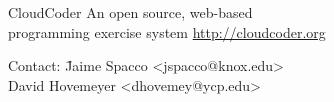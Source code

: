 \documentclass[11pt,a4paper]{memoir}
\begin{document}
\pagecolor{white}

\begin{minipage}[t]{50mm}
{\Huge CloudCoder}
\vskip 3mm
An open source, web-based\\
programming exercise system
\vskip 3mm
\url{http://cloudcoder.org}
\end{minipage}\hskip 2mm\begin{minipage}[t]{25mm}
\end{minipage}
\vskip 2mm
{\small
\begin{tabbing}
Contact: \= Jaime Spacco \textless jspacco@knox.edu\textgreater \\
         \> David Hovemeyer \textless dhovemey@ycp.edu\textgreater
\end{tabbing}
}
\end{document}
